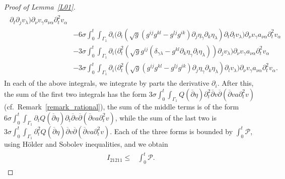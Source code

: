 \documentclass[10pt,reqno]{amsart}
\theoremstyle{plain}
\theoremstyle{definition}
\numberwithin{equation}{section}
\newcommand{\ccP}{\mathscr{P}}
\newcommand{\al}{\alpha}
\newcommand{\ga}{\gamma}
\newcommand{\Ga}{\Gamma}
\newcommand{\de}{\delta}
\newcommand{\la}{\lambda}
\newcommand{\si}{\sigma}
\begin{document}
\begin{proof}[Proof of Lemma~\ref{L01}]
\begin{align}
\begin{split}
\partial_t \partial_j v_\la 
\big )
\partial_\nu v_\ga a_{\nu \al} \partial^2_t v_\al
\\
&
-6\si 
\int_0^t \int_{\Ga_1}
\partial_i \big (
 \partial_t( \sqrt{g}(g^{ij} g^{kl} - g^{lj}g^{ik} ) \partial_j \eta_\ga \partial_k\eta_\la )
\partial_t \partial_l v_\la 
\big )
\partial_\nu v_\ga a_{\nu \al} \partial^2_t v_\al
\\
&
- 3\si \int_0^t \int_{\Ga_1}
\partial_i \big (
\partial^2_t( \sqrt{g} g^{ij} (\de_{\ga\la} -g^{kl} \partial_k \eta_\ga \partial_l \eta_\la) )
\partial_j v_\la 
\big )
\partial_\nu v_\ga a_{\nu \al} \partial^2_t v_\al
\\
&
-3\si 
\int_0^t \int_{\Ga_1}
\partial_i \big (
 \partial^2_t( \sqrt{g}(g^{ij} g^{kl} - g^{lj}g^{ik} ) \partial_j \eta_\ga \partial_k\eta_\la )
\partial_l v_\la 
\big )
\partial_\nu v_\ga a_{\nu \al} \partial^2_t v_\al.
\end{split}
\nonumber
\end{align}
In each of the above integrals, we integrate by parts the derivative $\partial_i$.
After this, the sum of the first two integrals has the form
$3 \si \int_0^t \int_{\Ga_1} Q(\overline{\partial}\eta ) \partial^2_t \overline{\partial} v
\overline{\partial}( \overline{\partial} v a \partial^2_t v )
$ (cf.~Remark~\ref{remark_rational}),
the sum of the middle terms is
of the form
$6 \si
\int_0^t \int_{\Ga_1} 
\partial_t Q(\overline{\partial} \eta) \partial_t \overline{\partial} v
\overline{\partial}( \overline{\partial} v a \partial^2_t v )
$,
while the sum of the last two is
$3 \si
\int_0^t \int_{\Ga_1}
\partial^2_t Q(\overline{\partial} \eta ) \overline{\partial} v
\overline{\partial}( \overline{\partial} v a \partial^2_t v )
$.
Each of the three forms is bounded by
$\int_{0}^{t}\ccP$, using H\"older and Sobolev inequalities, and we obtain
\begin{align}
\begin{split}
I_{21211} \leq & 
\int_0^t \ccP.
\end{split}
\label{estimate_I_21211}
\end{align}
%
%

\end{proof}
\end{document}
